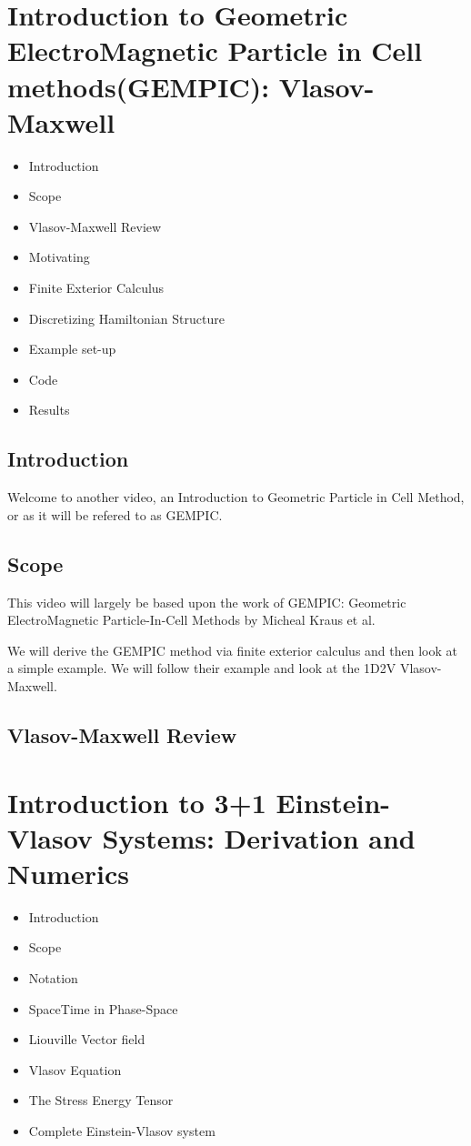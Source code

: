 \section{Introduction to Geometric ElectroMagnetic Particle in Cell methods(GEMPIC): Vlasov-Maxwell}
\begin{itemize}
  \item Introduction
  \item Scope
  \item Vlasov-Maxwell Review
  \item Motivating
  \item Finite Exterior Calculus
  \item Discretizing Hamiltonian Structure
  \item Example set-up
  \item Code
  \item Results
\end{itemize}

\subsection{Introduction}
Welcome to another video, an Introduction to Geometric Particle in Cell Method, or as it will be refered to as GEMPIC.

\subsection{Scope}

This video will largely be based upon the work of GEMPIC: Geometric ElectroMagnetic Particle-In-Cell Methods by Micheal Kraus et al.

We will derive the GEMPIC method via finite exterior calculus and then look at a simple example. We will follow their example and look at the 1D2V Vlasov-Maxwell.

\subsection{Vlasov-Maxwell Review}



\section{Introduction to 3+1 Einstein-Vlasov Systems: Derivation and Numerics}

\begin{itemize}
  \item Introduction
  \item Scope
  \item Notation
  \item SpaceTime in Phase-Space
  \item Liouville Vector field
  \item Vlasov Equation
  \item The Stress Energy Tensor
  \item Complete Einstein-Vlasov system
\end{itemize}
